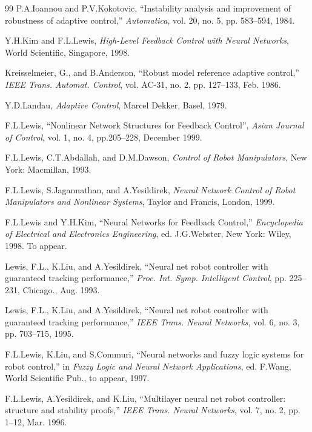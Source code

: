 \documentclass[12pt,a4paper]{ctexart}
\begin{document}
\begin{thebibliography}{99}
 P.A.Ioannou and P.V.Kokotovic, ``Instability analysis and improvement of robustness of adaptive control,'' \textit{Automatica}, vol. 20, no. 5, pp. 583--594, 1984.

 Y.H.Kim and F.L.Lewis, \textit{High-Level Feedback Control with Neural Networks}, World Scientific, Singapore, 1998.

 Kreisselmeier, G., and B.Anderson, ``Robust model reference adaptive control,'' \textit{IEEE Trans. Automat. Control}, vol. AC-31, no. 2, pp. 127--133, Feb. 1986.

 Y.D.Landau, \textit{Adaptive Control}, Marcel Dekker, Basel, 1979.

 F.L.Lewis, ``Nonlinear Network Structures for Feedback Control'', \textit{Asian Journal of Control}, vol. 1, no. 4, pp.205--228, December 1999.

 F.L.Lewis, C.T.Abdallah, and D.M.Dawson, \textit{Control of Robot Manipulators}, New York: Macmillan, 1993.

 F.L.Lewis, S.Jagannathan, and A.Yesildirek, \textit{Neural Network Control of Robot Manipulators and Nonlinear Systems}, Taylor and Francis, London, 1999.

 F.L.Lewis and Y.H.Kim, ``Neural Networks for Feedback Control,'' \textit{Encyclopedia of Electrical and Electronics Engineering}, ed. J.G.Webster, New York: Wiley, 1998. To appear.

 Lewis, F.L., K.Liu, and A.Yesildirek, ``Neural net robot controller with guaranteed tracking performance,'' \textit{Proc. Int. Symp. Intelligent Control}, pp. 225--231, Chicago., Aug. 1993.

 Lewis, F.L., K.Liu, and A.Yesildirek, ``Neural net robot controller with guaranteed tracking performance,'' \textit{IEEE Trans. Neural Networks}, vol. 6, no. 3, pp. 703--715, 1995.

 F.L.Lewis, K.Liu, and S.Commuri, ``Neural networks and fuzzy logic systems for robot control,'' in \textit{Fuzzy Logic and Neural Network Applications}, ed. F.Wang, World Scientific Pub., to appear, 1997.

 F.L.Lewis, A.Yesildirek, and K.Liu, ``Multilayer neural net robot controller: structure and stability proofs,'' \textit{IEEE Trans. Neural Networks}, vol. 7, no. 2, pp. 1--12, Mar. 1996.


\end{thebibliography}
\end{document}
